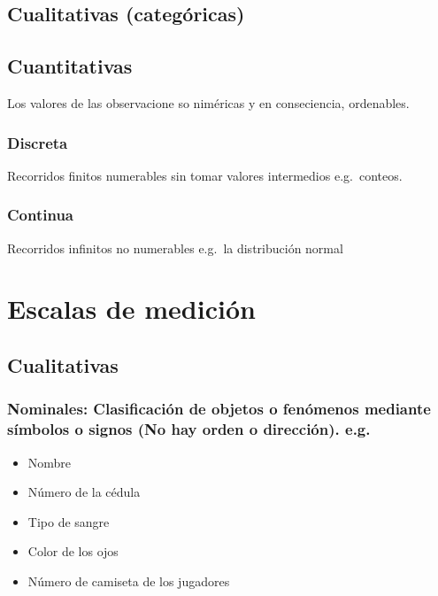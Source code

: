 \documentclass[twocolumn]{article}
\providecommand{\tightlist}{%
  \setlength{\itemsep}{0pt}\setlength{\parskip}{0pt}}
\begin{document}
\subsection{Cualitativas
(categóricas)}\label{cualitativas-categuxf3ricas}

\subsection{Cuantitativas}\label{cuantitativas}

Los valores de las observacione so niméricas y en conseciencia,
ordenables.

\subsubsection{Discreta}\label{discreta}

Recorridos finitos numerables sin tomar valores intermedios
e.g.~conteos.

\subsubsection{Continua}\label{continua}

Recorridos infinitos no numerables e.g.~la distribución normal

\section{Escalas de medición}\label{escalas-de-mediciuxf3n}

\subsection{Cualitativas}\label{cualitativas}

\subsubsection{Nominales: Clasificación de objetos o fenómenos mediante
símbolos o signos (No hay orden o dirección).
e.g.}\label{nominales-clasificaciuxf3n-de-objetos-o-fenuxf3menos-mediante-suxedmbolos-o-signos-no-hay-orden-o-direcciuxf3n.-e.g.}

\begin{itemize}
\tightlist
\item
  Nombre
\item
  Número de la cédula
\item
  Tipo de sangre
\item
  Color de los ojos
\item
  Número de camiseta de los jugadores
\end{itemize}
\end{document}
